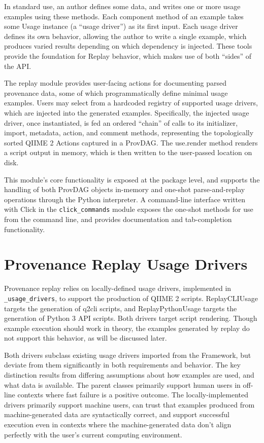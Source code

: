 In standard use, an author defines some data, and writes one or more usage
examples using these methods. Each component method of an example takes some
Usage instance (a “usage driver”) as its first input. Each usage driver defines
its own behavior, allowing the author to write a single example, which produces
varied results depending on which dependency is injected. These tools provide
the foundation for Replay behavior, which makes use of both “sides” of the API. 

The replay module provides user-facing actions for documenting parsed provenance
data, some of which programmatically define minimal usage examples. Users may
select from a hardcoded registry of supported usage drivers, which are injected
into the generated examples. Specifically, the injected usage driver, once
instantiated, is fed an ordered “chain” of calls to its initializer, import,
metadata, action, and comment methods, representing the topologically sorted
QIIME 2 Actions captured in a ProvDAG. The use.render method renders a script
output in memory, which is then written to the user-passed location on disk.

This module’s core functionality is exposed at the package level, and supports
the handling of both ProvDAG objects in-memory and one-shot parse-and-replay
operations through the Python interpreter. A command-line interface written with
Click \parencite{pallets_click_2014} in the \texttt{click\_commands} module exposes the
one-shot methods for use from the command line, and provides documentation and
tab-completion functionality.


\section{Provenance Replay Usage Drivers}

Provenance replay relies on locally-defined usage drivers, implemented in
\texttt{\_usage\_drivers}, to support the production of QIIME 2 scripts. ReplayCLIUsage
targets the generation of q2cli scripts, and ReplayPythonUsage targets the
generation of Python 3 API scripts. Both drivers target script rendering. Though
example execution should work in theory, the examples generated by replay do not
support this behavior, as will be discussed later.

Both drivers subclass existing usage drivers imported from the Framework, but
deviate from them significantly in both requirements and behavior. The key
distinction results from differing assumptions about how examples are used, and
what data is available. The parent classes primarily support human users in
off-line contexts where fast failure is a positive outcome. The
locally-implemented drivers primarily support machine users, can trust that
examples produced from machine-generated data are syntactically correct, and
support successful execution even in contexts where the machine-generated data
don’t align perfectly with the user’s current computing environment. 

